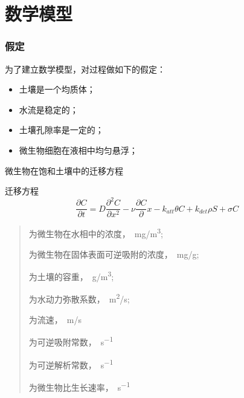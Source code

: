 \documentclass[xcolor=dvipsnames]{beamer}
\begin{document}
\section{数学模型}
	\begin{frame}
	\frametitle{假定}
	为了建立数学模型，对过程做如下的假定：
	\begin{itemize}
	\fangsong
	\item 土壤是一个均质体； 
	\item 水流是稳定的； 
	\item 土壤孔隙率是一定的； 
	\item 微生物细胞在液相中均匀悬浮； 
	\end{itemize}\par
	\end{frame}
	\begin{frame}{微生物在饱和土壤中的迁移方程}
	\begin{block}{\fangsong 迁移方程}
	\begin{equation}\label{qianyif}
	\dfrac{\partial C}{\partial t}=D\dfrac{\partial^2 C}{\partial x^2}-\nu\dfrac{\partial C}{\partial }x-k_{att}\theta C+k_{det}\rho S+\sigma C
	\end{equation}
	\end{block}
	\begin{quote}
	\begin{description}\setlength{\itemsep}{0em}
	\item[$C$]为微生物在水相中的浓度，\SI{}{mg/m^3};
	\item[$S$]为微生物在固体表面可逆吸附的浓度，\SI{}{mg/g};
	\item[$\rho$]为土壤的容重，\SI{}{g/m^3};
	\item[$D$]为水动力弥散系数，\SI{}{m^2/s};
	\item[$v$]为流速，\SI{}{m/s}
	\item[$k_{att}$]为可逆吸附常数，\SI{}{s^{-1}}
	\item[$k_{det}$]为可逆解析常数，\SI{}{s^{-1}}
	\item[$\sigma$]为微生物比生长速率，\SI{}{s^{-1}}
	\end{description}
	\end{quote}
	\end{frame}
\end{document}
